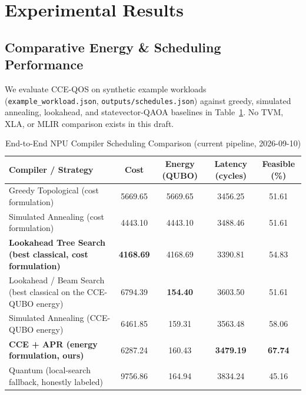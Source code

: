 \documentclass[journal]{IEEEtran}
\theoremstyle{definition}
\begin{document}
\section{Experimental Results}
\subsection{Comparative Energy \& Scheduling Performance}
We evaluate CCE-QOS on synthetic example workloads (\texttt{example\_workload.json}, \texttt{outputs/schedules.json}) against greedy, simulated annealing, lookahead, and statevector-QAOA baselines in Table~\ref{tab:compiler}. No TVM, XLA, or MLIR comparison exists in this draft.

\begin{table}[ht]
\centering
\caption{End-to-End NPU Compiler Scheduling Comparison (current pipeline, 2026-09-10)}
\label{tab:compiler}
\begin{tabular}{lcccc}
\toprule
\textbf{Compiler / Strategy} & \textbf{Cost} & \textbf{Energy (QUBO)} & \textbf{Latency (cycles)} & \textbf{Feasible (\%)} \\
\midrule
Greedy Topological (cost formulation) & 5669.65 & 5669.65 & 3456.25 & 51.61 \\
Simulated Annealing (cost formulation) & 4443.10 & 4443.10 & 3488.46 & 51.61 \\
\textbf{Lookahead Tree Search (best classical, cost formulation)} & \textbf{4168.69} & 4168.69 & 3390.81 & 54.83 \\
Lookahead / Beam Search (best classical on the CCE-QUBO energy) & 6794.39 & \textbf{154.40} & 3603.50 & 51.61 \\
Simulated Annealing (CCE-QUBO energy) & 6461.85 & 159.31 & 3563.48 & 58.06 \\
\textbf{CCE + APR (energy formulation, ours)} & 6287.24 & 160.43 & \textbf{3479.19} & \textbf{67.74} \\
Quantum (local-search fallback, honestly labeled) & 9756.86 & 164.94 & 3834.24 & 45.16 \\
\bottomrule
\end{tabular}
\end{table}
\end{document}
